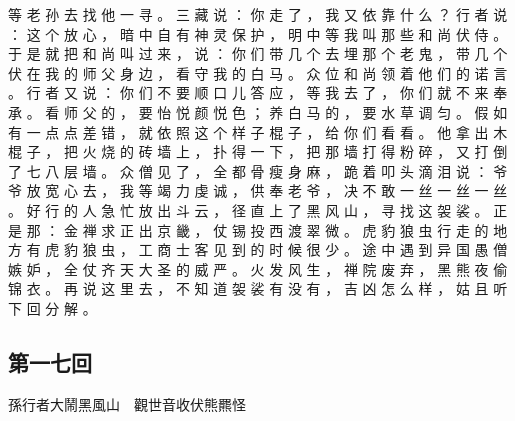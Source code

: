 {等 老 孙 去 找 他 一 寻 。
三 藏 说 ： 你 走 了 ， 我 又 依 靠 什 么 ？ 行 者 说 ： 这 个 放 心 ， 暗 中 自 有 神 灵 保 护 ， 明 中 等 我 叫 那 些 和 尚 伏 侍 。
于 是 就 把 和 尚 叫 过 来 ， 说 ： 你 们 带 几 个 去 埋 那 个 老 鬼 ， 带 几 个 伏 在 我 的 师 父 身 边 ， 看 守 我 的 白 马 。
众 位 和 尚 领 着 他 们 的 诺 言 。
行 者 又 说 ： 你 们 不 要 顺 口 儿 答 应 ， 等 我 去 了 ， 你 们 就 不 来 奉 承 。
看 师 父 的 ， 要 怡 悦 颜 悦 色 ； 养 白 马 的 ， 要 水 草 调 匀 。
假 如 有 一 点 点 差 错 ， 就 依 照 这 个 样 子 棍 子 ， 给 你 们 看 看 。
他 拿 出 木 棍 子 ， 把 火 烧 的 砖 墙 上 ， 扑 得 一 下 ， 把 那 墙 打 得 粉 碎 ， 又 打 倒 了 七 八 层 墙 。
众 僧 见 了 ， 全 都 骨 瘦 身 麻 ， 跪 着 叩 头 滴 泪 说 ： 爷 爷 放 宽 心 去 ， 我 等 竭 力 虔 诚 ， 供 奉 老 爷 ， 决 不 敢 一 丝 一 丝 一 丝 。
好 行 的 人 急 忙 放 出 斗 云 ， 径 直 上 了 黑 风 山 ， 寻 找 这 袈 裟 。
正 是 那 ： 金 禅 求 正 出 京 畿 ， 仗 锡 投 西 渡 翠 微 。
虎 豹 狼 虫 行 走 的 地 方 有 虎 豹 狼 虫 ， 工 商 士 客 见 到 的 时 候 很 少 。
途 中 遇 到 异 国 愚 僧 嫉 妒 ， 全 仗 齐 天 大 圣 的 威 严 。
火 发 风 生 ， 禅 院 废 弃 ， 黑 熊 夜 偷 锦 衣 。
再 说 这 里 去 ， 不 知 道 袈 裟 有 没 有 ， 吉 凶 怎 么 样 ， 姑 且 听 下 回 分 解 。
}\switchcolumn\flushpage  \begin{pinyinscope}{\myfontt \section{第一七回}     孫行者大鬧黑風山　觀世音收伏熊羆怪

}
\end{pinyinscope}
